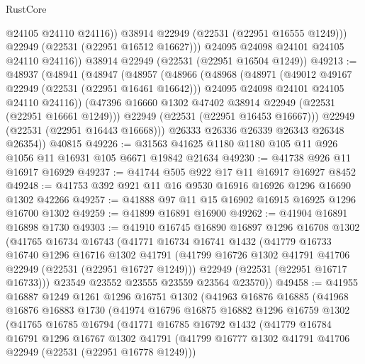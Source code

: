 \begin{lexlean}{RustCore}
\begin{coremodule}
                @24105
                @24110
                @24116))
            @38914
            @22949
            (@22531 (@22951 @16555 @1249)))
          @22949
          (@22531 (@22951 @16512 @16627)))
        @24095
        @24098
        @24101
        @24105
        @24110
        @24116))
    @38914
    @22949
    (@22531 (@22951 @16504 @1249))
@49213 := @48937
    (@48941
      (@48947
        (@48957
          (@48966
            (@48968
              (@48971
                (@49012 @49167 @22949 (@22531 (@22951 @16461 @16642)))
                @24095
                @24098
                @24101
                @24105
                @24110
                @24116))
            (@47396 @16660 @1302 @47402 @38914 @22949 (@22531 (@22951 @16661 @1249)))
            @22949
            (@22531 (@22951 @16453 @16667)))
          @22949
          (@22531 (@22951 @16443 @16668)))
        @26333
        @26336
        @26339
        @26343
        @26348
        @26354))
    @40815
@49226 := @31563 @41625 @1180 @1180 @105 @11 @926 @1056 @11 @16931 @105 @6671 @19842 @21634
@49230 := @41738 @926 @11 @16917 @16929
@49237 := @41744 @505 @922 @17 @11 @16917 @16927 @8452
@49248 := @41753 @392 @921 @11 @16 @9530 @16916 @16926 @1296 @16690 @1302 @42266
@49257 := @41888 @97 @11 @15 @16902 @16915 @16925 @1296 @16700 @1302
@49259 := @41899 @16891 @16900
@49262 := @41904 @16891 @16898 @1730
@49303 := @41910
    @16745
    @16890
    @16897
    @1296
    @16708
    @1302
    (@41765
      @16734
      @16743
      (@41771
        @16734
        @16741
        @1432
        (@41779
          @16733
          @16740
          @1296
          @16716
          @1302
          @41791
          (@41799 @16726 @1302 @41791 @41706 @22949 (@22531 (@22951 @16727 @1249)))
          @22949
          (@22531 (@22951 @16717 @16733)))
        @23549
        @23552
        @23555
        @23559
        @23564
        @23570))
@49458 := @41955
    @16887
    @1249
    @1261
    @1296
    @16751
    @1302
    (@41963
      @16876
      @16885
      (@41968
        @16876
        @16883
        @1730
        (@41974
          @16796
          @16875
          @16882
          @1296
          @16759
          @1302
          (@41765
            @16785
            @16794
            (@41771
              @16785
              @16792
              @1432
              (@41779
                @16784
                @16791
                @1296
                @16767
                @1302
                @41791
                (@41799 @16777 @1302 @41791 @41706 @22949 (@22531 (@22951 @16778 @1249)))

\end{coremodule}
\end{lexlean}

